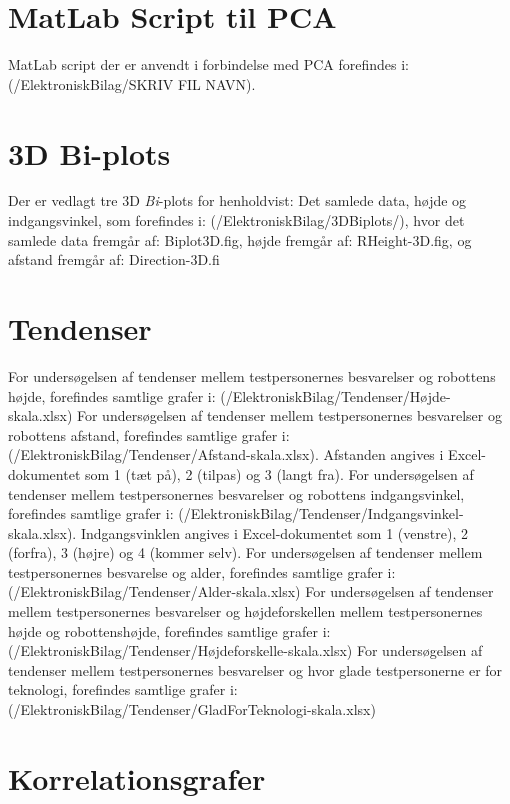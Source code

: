 \section{MatLab Script til PCA}
\label{ElektroniskBilagMatLabPCA}
%
MatLab script der er anvendt i forbindelse med PCA forefindes i: (/ElektroniskBilag/SKRIV FIL NAVN).


\section{3D Bi-plots}
\label{ElektroniskBilag3D}
%
Der er vedlagt tre 3D \textit{Bi}-plots for henholdvist: Det samlede data, højde og indgangsvinkel, som forefindes i: (/ElektroniskBilag/3DBiplots/), hvor det samlede data fremgår af: Biplot3D.fig, højde fremgår af: RHeight-3D.fig, og afstand fremgår af: Direction-3D.fi

\section{Tendenser}
\label{ElektroniskBilagTendenser}
%
For undersøgelsen af tendenser mellem testpersonernes besvarelser og robottens højde, forefindes samtlige grafer i: (/ElektroniskBilag/Tendenser/Højde-skala.xlsx)\blankline
%
For undersøgelsen af tendenser mellem testpersonernes besvarelser og robottens afstand, forefindes samtlige grafer i: (/ElektroniskBilag/Tendenser/Afstand-skala.xlsx). Afstanden angives i Excel-dokumentet som 1 (tæt på), 2 (tilpas) og 3 (langt fra).\blankline
%
For undersøgelsen af tendenser mellem testpersonernes besvarelser og robottens indgangsvinkel, forefindes samtlige grafer i: (/ElektroniskBilag/Tendenser/Indgangsvinkel-skala.xlsx). Indgangsvinklen angives i Excel-dokumentet som 1 (venstre), 2 (forfra), 3 (højre) og 4 (kommer selv).\blankline
%
For undersøgelsen af tendenser mellem testpersonernes besvarelse og alder, forefindes samtlige grafer i: (/ElektroniskBilag/Tendenser/Alder-skala.xlsx)\blankline
%
For undersøgelsen af tendenser mellem testpersonernes besvarelser og højdeforskellen mellem testpersonernes højde og robottenshøjde, forefindes samtlige grafer i: \\
(/ElektroniskBilag/Tendenser/Højdeforskelle-skala.xlsx)\blankline
%
For undersøgelsen af tendenser mellem testpersonernes besvarelser og hvor glade testpersonerne er for teknologi, forefindes samtlige grafer i:\\
(/ElektroniskBilag/Tendenser/GladForTeknologi-skala.xlsx)

\section{Korrelationsgrafer}
\label{ElektroniskBilagKorrelationsgrafer}
%

